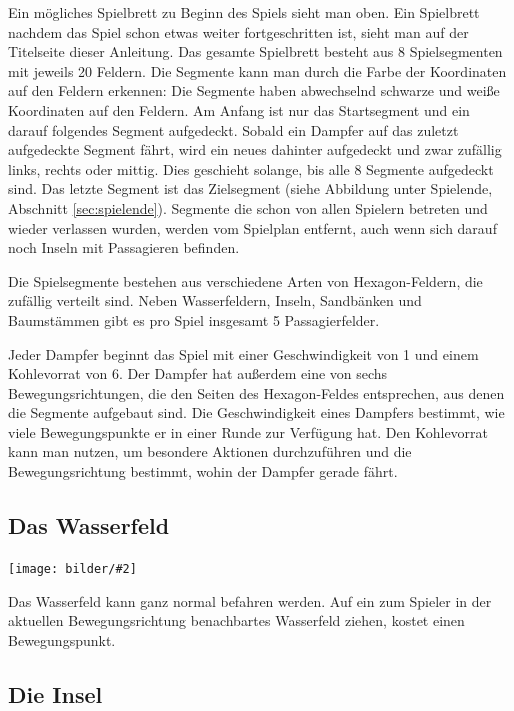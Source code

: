 \documentclass[12pt,a4paper, ngerman, oneside]{scrartcl}
\def\Tiles/{8}
\def\FieldsPerTile/{20}
\def\Passagiere/{5}
\newcommand{\fieldGraphic}[2]{%
\begin{floatingfigure}[#1]{0.15\textwidth}%
  \centering
  \texttt{[image: bilder/\#2]}%
\end{floatingfigure}%
}
\begin{document}
Ein mögliches Spielbrett zu Beginn des Spiels sieht man oben. Ein Spielbrett
nachdem das Spiel schon etwas weiter fortgeschritten ist, sieht man auf der
Titelseite dieser Anleitung. Das gesamte Spielbrett besteht aus \Tiles/
Spielsegmenten mit jeweils \FieldsPerTile/ Feldern. Die Segmente kann man durch
die Farbe der Koordinaten auf den Feldern erkennen: Die Segmente haben
abwechselnd schwarze und weiße Koordinaten auf den Feldern. Am Anfang ist nur
das Startsegment und ein darauf folgendes Segment aufgedeckt. Sobald ein Dampfer
auf das zuletzt aufgedeckte Segment fährt, wird ein neues dahinter aufgedeckt
und zwar zufällig links, rechts oder mittig. Dies geschieht solange, bis alle
\Tiles/ Segmente aufgedeckt sind. Das letzte Segment ist das Zielsegment (siehe
Abbildung unter Spielende, Abschnitt \ref{sec:spielende}). Segmente die schon von allen
Spielern betreten und wieder verlassen wurden, werden vom Spielplan entfernt,
auch wenn sich darauf noch Inseln mit Passagieren befinden.

Die Spielsegmente bestehen aus verschiedene Arten von Hexagon-Feldern, die
zufällig verteilt sind. Neben Wasserfeldern, Inseln, Sandbänken und Baumstämmen
gibt es pro Spiel insgesamt \Passagiere/ Passagierfelder.

Jeder Dampfer beginnt das Spiel mit einer Geschwindigkeit von 1 und einem
Kohlevorrat von 6. Der Dampfer hat außerdem eine von sechs Bewegungsrichtungen,
die den Seiten des Hexagon-Feldes entsprechen, aus denen die Segmente aufgebaut
sind. Die Geschwindigkeit eines Dampfers bestimmt, wie viele Bewegungspunkte er
in einer Runde zur Verfügung hat. Den Kohlevorrat kann man nutzen, um besondere
Aktionen durchzuführen und die Bewegungsrichtung bestimmt, wohin der Dampfer
gerade fährt.

\subsection{\label{water}Das Wasserfeld}

\fieldGraphic{r}{wasser}

Das Wasserfeld kann ganz normal befahren werden. Auf ein zum Spieler in der
aktuellen Bewegungsrichtung benachbartes Wasserfeld ziehen, kostet einen
Bewegungspunkt.

\paragraph{}

\subsection{\label{island}Die Insel}
\end{document}
